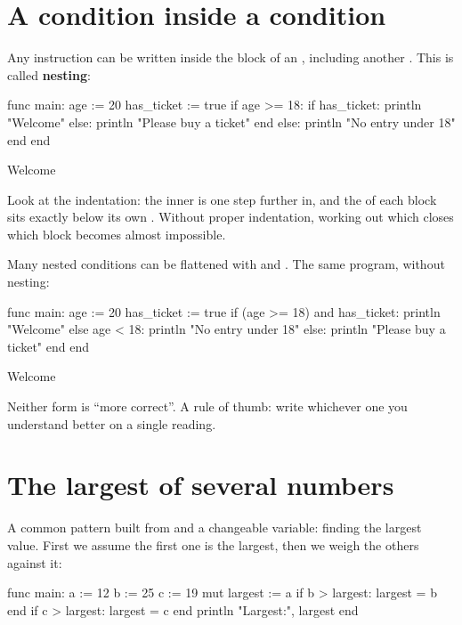 \section{A condition inside a condition}

Any instruction can be written inside the block of an , including
another . This is called \textbf{nesting}:

\begin{salamcode}
func main:
    age := 20
    has_ticket := true
    if age >= 18:
        if has_ticket:
            println "Welcome"
        else:
            println "Please buy a ticket"
        end
    else:
        println "No entry under 18"
    end
end
\end{salamcode}

\begin{salamout}
Welcome
\end{salamout}

Look at the indentation: the inner  is one step further in, and
the  of each block sits exactly below its own . Without
proper indentation, working out which  closes which block becomes
almost impossible.

Many nested conditions can be flattened with  and . The
same program, without nesting:

\begin{salamcode}
func main:
    age := 20
    has_ticket := true
    if (age >= 18) and has_ticket:
        println "Welcome"
    else age < 18:
        println "No entry under 18"
    else:
        println "Please buy a ticket"
    end
end
\end{salamcode}

\begin{salamout}
Welcome
\end{salamout}

Neither form is ``more correct''. A rule of thumb: write whichever one you
understand better on a single reading.

\section{The largest of several numbers}

A common pattern built from  and a changeable variable: finding the
largest value. First we assume the first one is the largest, then we weigh
the others against it:

\begin{salamcode}
func main:
    a := 12
    b := 25
    c := 19
    mut largest := a
    if b > largest: largest = b end
    if c > largest: largest = c end
    println "Largest:", largest
end
\end{salamcode}


